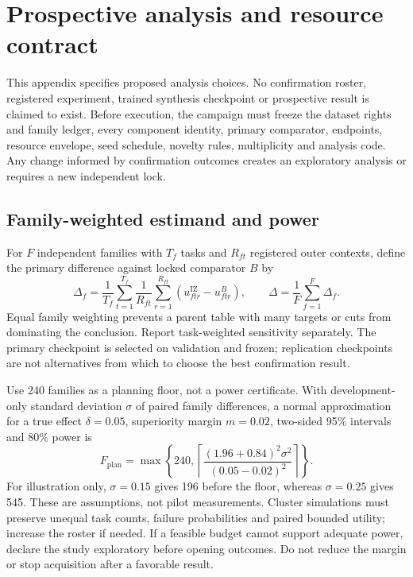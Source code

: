 \section{Prospective analysis and resource contract}
\label{app:statistics}

This appendix specifies proposed analysis choices. No confirmation roster,
registered experiment, trained synthesis checkpoint or prospective result is
claimed to exist. Before execution, the campaign must freeze the dataset rights
and family ledger, every component identity, primary comparator, endpoints,
resource envelope, seed schedule, novelty rules, multiplicity and analysis code.
Any change informed by confirmation outcomes creates an exploratory analysis or
requires a new independent lock.

\subsection{Family-weighted estimand and power}

For $F$ independent families with $T_f$ tasks and $R_{ft}$ registered outer
contexts, define the primary difference against locked comparator $B$ by
\begin{equation}
 \Delta_f=\frac{1}{T_f}\sum_{t=1}^{T_f}
   \frac{1}{R_{ft}}\sum_{r=1}^{R_{ft}}
       (u^{\mathrm{IZ}}_{ftr}-u^B_{ftr}),\qquad
 \Delta=\frac{1}{F}\sum_{f=1}^{F}\Delta_f.
\end{equation}
Equal family weighting prevents a parent table with many targets or cuts from
dominating the conclusion. Report task-weighted sensitivity separately. The
primary checkpoint is selected on validation and frozen; replication checkpoints
are not alternatives from which to choose the best confirmation result.

Use 240 families as a planning floor, not a power certificate. With
development-only standard deviation $\sigma$ of paired family differences, a
normal approximation for a true effect $\delta=0.05$, superiority margin
$m=0.02$, two-sided 95\% intervals and 80\% power is
\begin{equation}
 F_{\mathrm{plan}}=\max\!\left\{240,
 \left\lceil\frac{(1.96+0.84)^2\sigma^2}{(0.05-0.02)^2}\right\rceil\right\}.
\end{equation}
For illustration only, $\sigma=0.15$ gives 196 before the floor, whereas
$\sigma=0.25$ gives 545. These are assumptions, not pilot measurements. Cluster
simulations must preserve unequal task counts, failure probabilities and paired
bounded utility; increase the roster if needed. If a feasible budget cannot
support adequate power, declare the study exploratory before opening outcomes.
Do not reduce the margin or stop acquisition after a favorable result.


